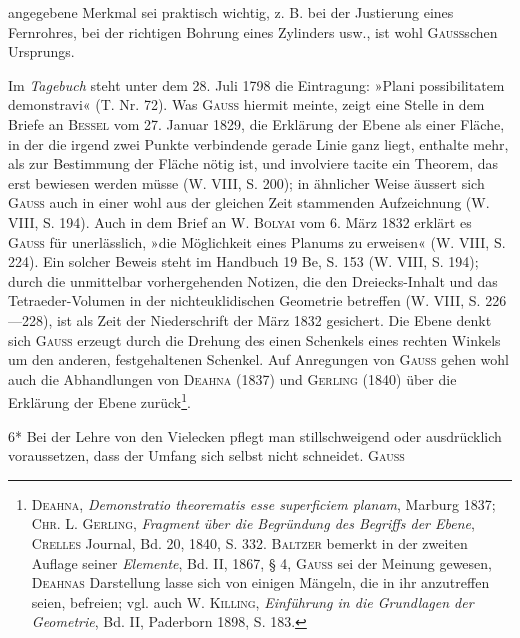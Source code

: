 angegebene Merkmal sei praktisch wichtig, z. B. bei der Justierung eines
Fernrohres, bei der richtigen Bohrung eines Zylinders usw., ist wohl \textsc{Gauss}schen
Ursprungs.
\par
Im \textit{Tagebuch} steht unter dem 28. Juli 1798 die Eintragung: »Plani possibilitatem
demonstravi« (T. Nr. 72). Was \textsc{Gauss} hiermit meinte, zeigt eine
Stelle in dem Briefe an \textsc{Bessel} vom 27. Januar 1829, die Erklärung der Ebene
als einer Fläche, in der die irgend zwei Punkte verbindende gerade Linie
ganz liegt, enthalte mehr, als zur Bestimmung der Fläche nötig ist, und involviere
tacite ein Theorem, das erst bewiesen werden müsse (W. VIII, S. 200);
in ähnlicher Weise äussert sich \textsc{Gauss} auch in einer wohl aus der gleichen
Zeit stammenden Aufzeichnung (W. VIII, S. 194). Auch in dem Brief an
W. \textsc{Bolyai} vom 6. März 1832 erklärt es \textsc{Gauss} für unerlässlich, »die Möglichkeit
eines Planums zu erweisen« (W. VIII, S. 224). Ein solcher Beweis steht
im Handbuch 19 Be, S. 153 (W. VIII, S. 194); durch die unmittelbar vorhergehenden
Notizen, die den Dreiecks-Inhalt und das Tetraeder-Volumen in der
nichteuklidischen Geometrie betreffen (W. VIII, S. 226—228), ist als Zeit der
Niederschrift der März 1832 gesichert. Die Ebene denkt sich \textsc{Gauss} erzeugt
durch die Drehung des einen Schenkels eines rechten Winkels um den anderen,
festgehaltenen Schenkel. Auf Anregungen von \textsc{Gauss} gehen wohl auch die
Abhandlungen von \textsc{Deahna} (1837) und \textsc{Gerling} (1840) über die Erklärung
der Ebene zurück\footnote{\textsc{Deahna}, \textit{Demonstratio theorematis esse superficiem planam}, Marburg 1837; \textsc{Chr. L. Gerling}, \textit{Fragment über die Begründung des Begriffs der Ebene}, \textsc{Crelles} Journal, Bd. 20, 1840, S. 332. \textsc{Baltzer} bemerkt in der zweiten Auflage seiner \textit{Elemente}, Bd. II, 1867, § 4, \textsc{Gauss} sei der Meinung gewesen, \textsc{Deahnas} Darstellung lasse sich von einigen Mängeln, die in ihr anzutreffen seien, befreien; vgl. auch W. \textsc{Killing}, \textit{Einführung in die Grundlagen der Geometrie}, Bd. II, Paderborn 1898, S. 183.}.
\par\vfill\hfill{\footnotesize 6*}\hspace*{2em}
\clearpage{}\setcounter{footnote}{0}
\noindent\hspace*{\parindent}Bei der Lehre von den Vielecken pflegt man stillschweigend oder ausdrücklich
voraussetzen, dass der Umfang sich selbst nicht schneidet. \textsc{Gauss}
